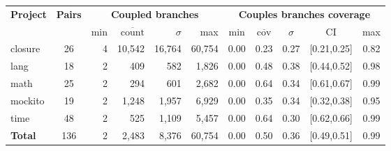 \begin{tabular}{ l c | rrrr | ccccc }
\hline 
\textbf{Project} & \textbf{Pairs} & \multicolumn{4}{c|}{\textbf{Coupled branches}} & \multicolumn{5}{c}{\textbf{Couples branches coverage}} \\ 
  &   & min & $\overline{\text{count}}$ & $\sigma$ & max & min & $\overline{\text{cov}}$ & $\sigma$ & CI & max \\ 
\hline 
closure & 26 & 4 & 10,542 & 16,764 & 60,754 & 0.00 & 0.23 & 0.27 & [0.21,0.25] & 0.82 \\ 
lang & 18 & 2 & 409 & 582 & 1,826 & 0.00 & 0.48 & 0.38 & [0.44,0.52] & 0.98 \\ 
math & 25 & 2 & 294 & 601 & 2,682 & 0.00 & 0.64 & 0.34 & [0.61,0.67] & 0.99 \\ 
mockito & 19 & 2 & 1,248 & 1,957 & 6,929 & 0.00 & 0.35 & 0.34 & [0.32,0.38] & 0.95 \\ 
time & 48 & 2 & 525 & 1,109 & 5,457 & 0.00 & 0.64 & 0.30 & [0.62,0.66] & 0.99 \\ 
\hline 
\textbf{ Total  } & 136 & 2 & 2,483 & 8,376 & 60,754 & 0.00 & 0.50 & 0.36 & [0.49,0.51] & 0.99 \\ 
\end{tabular}